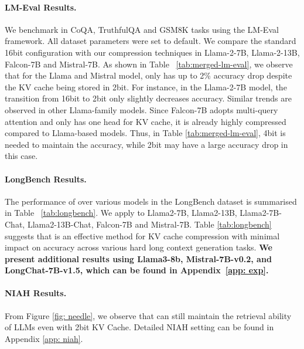 \paragraph{LM-Eval Results.}
We benchmark \kivi{} in CoQA, TruthfulQA and GSM8K tasks using the LM-Eval framework. All dataset parameters were set to default. We compare the standard 16bit configuration with our \kivi{} compression techniques in Llama-2-7B, Llama-2-13B, Falcon-7B and Mistral-7B. As shown in Table ~\ref{tab:merged-lm-eval}, we observe that for the Llama and Mistral model, \kivi{} only has up to 2\% accuracy drop despite the KV cache being stored in 2bit.
For instance, in the Llama-2-7B model, the transition from 16bit to 2bit only slightly decreases accuracy. 
Similar trends are observed in other Llama-family models.
Since Falcon-7B adopts multi-query attention and only has one head for KV cache, it is already highly compressed compared to Llama-based models.
Thus, in Table \ref{tab:merged-lm-eval}, 4bit \kivi{} is needed to maintain the accuracy, while 2bit \kivi{} may have a large accuracy drop in this case.

\paragraph{LongBench Results.}
The performance of \kivi{} over various models in the LongBench dataset is summarised in Table ~\ref{tab:longbench}. We apply \kivi{} to Llama2-7B, Llama2-13B, Llama2-7B-Chat, Llama2-13B-Chat, Falcon-7B and Mistral-7B.
Table \ref{tab:longbench} suggests that \kivi{} is an effective method for KV cache compression with minimal impact on accuracy across various hard long context generation tasks.
\textbf{We present additional results using Llama3-8b, Mistral-7B-v0.2, and LongChat-7B-v1.5, which can be found in Appendix~\ref{app: exp}.}

\paragraph{NIAH Results.} From Figure \ref{fig: needle}, we observe that \kivi{} can still maintain the retrieval ability of LLMs even with 2bit KV Cache. 
Detailed NIAH setting can be found in Appendix \ref{app: niah}.


